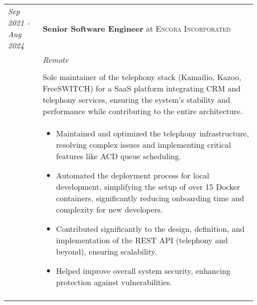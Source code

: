 \documentclass[a4paper,10pt]{article}
\begin{document}
    \begin{tabular}{@{} p{2.8cm} | p{12.2cm} @{}}
        \emph{Sep 2021 - Aug 2024}
        &\textbf{Senior Software Engineer} at \textsc
        {Encora Incorporated} \\

        &\emph
        {Remote} \\ \\
        &\normalsize
        {
            Sole maintainer of the telephony stack (Kamailio, Kazoo,
            FreeSWITCH) for a SaaS platform integrating CRM and telephony
            services, ensuring the system's stability and performance while
            contributing to the entire architecture.
        } \\
        & \begin{itemize}[leftmargin=*]
            \item Maintained and optimized the telephony infrastructure,
                resolving complex issues and implementing critical
                features like ACD queue scheduling.

            \item Automated the deployment process for local development,
                simplifying the setup of over 15 Docker containers,
                significantly reducing onboarding time and complexity
                for new developers.

            \item Contributed significantly to the design, definition,
                and implementation of the REST API (telephony and beyond),
                ensuring scalability.

            \item Helped improve overall system security, enhancing
                protection against vulnerabilities.
        \end{itemize} \\
        \multicolumn{2}{c}{}
    \end{tabular}
\end{document}
